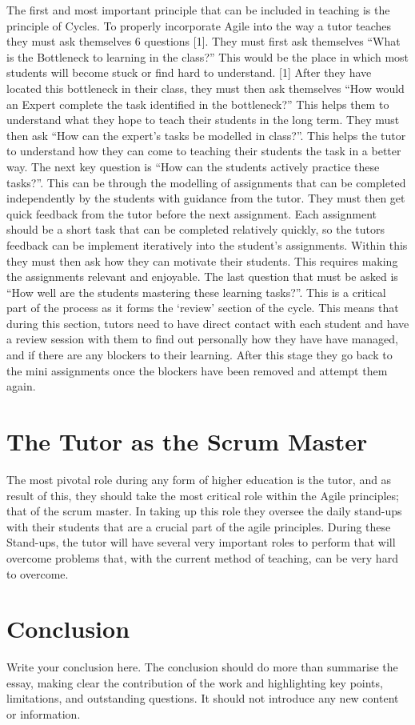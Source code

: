 \documentclass{scrartcl}
\begin{document}
The first and most important principle that can be included in teaching is the principle of Cycles. To properly incorporate Agile into the way a tutor teaches they must ask themselves 6 questions [1].
They must first ask themselves “What is the Bottleneck to learning in the class?” This would be the place in which most students will become stuck or find hard to understand. [1] After they have located this bottleneck in their class, they must then ask themselves “How would an Expert complete the task identified in the bottleneck?” This helps them to understand what they hope to teach their students in the long term. They must then ask “How can the expert’s tasks be modelled in class?”. This helps the tutor to understand how they can come to teaching their students the task in a better way. The next key question is “How can the students actively practice these tasks?”. This can be through the modelling of assignments that can be completed independently by the students with guidance from the tutor. They must then get quick feedback from the tutor before the next assignment. Each assignment should be a short task that can be completed relatively quickly, so the tutors feedback can be implement iteratively into the student’s assignments. Within this they must then ask how they can motivate their students. This requires making the assignments relevant and enjoyable. The last question that must be asked is “How well are the students mastering these learning tasks?”. This is a critical part of the process as it forms the ‘review’ section of the cycle. This means that during this section, tutors need to have direct contact with each student and have a review session with them to find out personally how they have have managed, and if there are any blockers to their learning. After this stage they go back to the mini assignments once the blockers have been removed and attempt them again.

\section{The Tutor as the Scrum Master}

The most pivotal role during any form of higher education is the tutor, and as result of this, they should take the most critical role within the Agile principles; that of the scrum master. In taking up this role they oversee the daily stand-ups with their students that are a crucial part of the agile principles. During these Stand-ups, the tutor will have several very important roles to perform that will overcome problems that, with the current method of teaching, can be very hard to overcome. 

\section{Conclusion}

Write your conclusion here. The conclusion should do more than summarise the essay, making clear the contribution of the work and highlighting key points, limitations, and outstanding questions. It should not introduce any new content or information.



\end{document}
